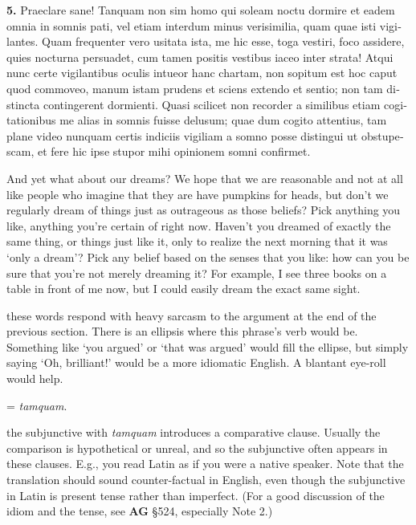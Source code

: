 \beginnumbering
\pstart
\begin{latin}
\textenglish{\textbf{5.}} Praeclare sane! Tanquam non sim homo qui soleam noctu dormire et eadem omnia in somnis pati, vel etiam interdum minus verisimilia, quam quae isti vigilantes. Quam frequenter vero usitata ista, me hic esse, toga vestiri, foco assidere, quies nocturna persuadet, cum tamen positis vestibus iaceo inter strata! Atqui nunc certe vigilantibus oculis intueor hanc chartam, non sopitum est hoc caput quod commoveo, manum istam prudens et sciens extendo et sentio; non tam distincta contingerent dormienti. Quasi scilicet non recorder a similibus etiam cogitationibus me alias in somnis fuisse delusum; quae dum cogito attentius, tam plane video nunquam certis indiciis vigiliam a somno posse distingui ut obstupescam, et fere hic ipse stupor mihi opinionem somni confirmet.
\end{latin}
\pend
\endnumbering

\prenotes

And yet what about our dreams? We hope that we are reasonable and not at all like people who imagine that they are have pumpkins for heads, but don't we regularly dream of things just as outrageous as those beliefs? Pick anything you like, anything you're certain of right now. Haven't you dreamed of exactly the same thing, or things just like it, only to realize the next morning that it was `only a dream'? Pick any belief based on the senses that you like: how can you be sure that you're not merely dreaming it? For example, I see three books on a table in front of me now, but I could easily dream the exact same sight.

 these words respond with heavy sarcasm to the argument at the end of the previous section. There is an ellipsis where this phrase's verb would be. Something like `you argued' or `that was argued' would fill the ellipse, but simply saying `Oh, brilliant!' would be a more idiomatic English. A blantant eye-roll would help.

 = \textit{tamquam}.

 the subjunctive with \textit{tamquam} introduces a comparative clause. Usually the comparison is hypothetical or unreal, and so the subjunctive often appears in these clauses. E.g., you read Latin as if you were a native speaker. Note that the translation should sound counter-factual in English, even though the subjunctive in Latin is present tense rather than imperfect. (For a good discussion of the idiom and the tense, see \textbf{AG} §524, especially Note 2.)

